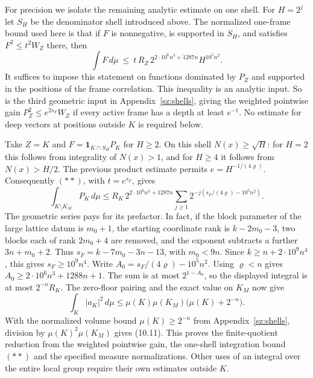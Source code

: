 For precision we isolate the remaining analytic estimate on one shell.
For $H=2^j$ let $S_H$ be the denominator shell introduced above.
The normalized one-frame bound used here is that if $F$ is
nonnegative, is supported in $S_H$, and satisfies $F^2\le t^2 W_Z$
there, then
\[
 \int F\,d\mu\ \le\
    t\,R_Z\,2^{2\cdot10^6 n^3+1287n} H^{10^5 n^2}.
 \tag{**}
\]
It suffices to impose this statement on functions dominated by $P_Z$
and supported in the positions of the frame correlation.
This inequality is an analytic input. So is the third geometric
input in Appendix~\ref{sz:shells}, giving the weighted pointwise
gain $P_Z^2\le e^{2s_F} W_Z$ if every active frame has a depth at least
$e^{-1}$. No estimate for deep vectors at positions outside $K$ is
required below.

Take $Z=K$ and $F=\mathbf 1_{K\cap S_H}P_K$ for $H\ge2$. On this
shell $N(x)\ge\sqrt H$: for $H=2$ this follows from integrality of
$N(x)>1$, and for $H\ge4$ it follows from $N(x)>H/2$.
The previous product estimate permits $e=H^{-1/(4\varrho)}$.
Consequently $(**)$, with $t=e^{s_F}$, gives
\[
 \int_{K\setminus K_M}P_K\,d\mu\le
 R_K\,2^{2\cdot10^6n^3+1287n}
    \sum_{j\ge1}2^{-j(s_F/(4\varrho)-10^5 n^2)} .
\]
The geometric series pays for its prefactor. In fact, if the block
parameter of the large lattice datum is $m_0+1$, the starting
coordinate rank is $k-2m_0-3$, two blocks each of rank $2m_0+4$
are removed, and the exponent subtracts a further $3n+m_0+2$.
Thus $s_F=k-7m_0-3n-13$, with $m_0<9n$. Since
$k\ge n+2\cdot10^9 n^4$, this gives $s_F\ge10^9 n^4$.
Write $A_0=s_F/(4\varrho)-10^5 n^2$.
Using $\varrho<n$ gives
$A_0\ge 2\cdot10^6n^3+1288n+1$.
The sum is at most $2^{1-A_0}$, so the displayed integral is at most
$2^{-n}R_K$. The zero-floor pairing and the exact value on $K_M$
now give
\[
 \int_K |a_K|^2\,d\mu\le
  \mu(K)\mu(K_M)\bigl(\mu(K)+2^{-n}\bigr).
\]
With the normalized volume bound $\mu(K)\ge2^{-n}$ from
Appendix~\ref{sz:shells}, division by $\mu(K)^2\mu(K_M)$ gives (10.11).
This proves the finite-quotient reduction from the weighted pointwise
gain, the one-shell integration bound $(**)$ and the specified
measure normalizations. Other uses of an integral over the entire
local group require their own estimates outside $K$.
